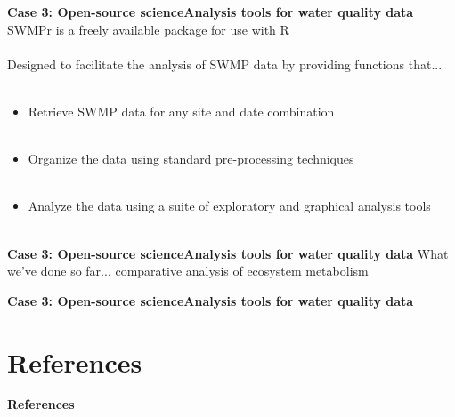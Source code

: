 \documentclass[serif]{beamer}\usepackage[]{graphicx}\usepackage[]{color}
\makeatletter
\newenvironment{kframe}{%
 \def\at@end@of@kframe{}%
 \ifinner\ifhmode%
  \def\at@end@of@kframe{\end{minipage}}%
  \begin{minipage}{\columnwidth}%
 \fi\fi%
 \def\FrameCommand##1{\hskip\@totalleftmargin \hskip-\fboxsep
 \colorbox{shadecolor}{##1}\hskip-\fboxsep
     \hskip-\linewidth \hskip-\@totalleftmargin \hskip\columnwidth}%
 \MakeFramed {\advance\hsize-\width
   \@totalleftmargin\z@ \linewidth\hsize
   \@setminipage}}%
 {\par\unskip\endMakeFramed%
 \at@end@of@kframe}
\newenvironment{knitrout}{}{} %
\makeatother
\begin{document}
\begin{frame}{\textbf{Case 3: Open-source science}}{\textbf{Analysis tools for water quality data}}
\alert{SWMPr} is a freely available package for use with R \\~\\
Designed to facilitate the analysis of SWMP data by providing functions that...\\~\\
\begin{itemize}
\item \alert{Retrieve} SWMP data for any site and date combination \\~\\ 
\item \alert{Organize} the data using standard pre-processing techniques \\~\\
\item \alert{Analyze} the data using a suite of exploratory and graphical analysis tools \\~\\
\end{itemize}
\end{frame}

\begin{frame}{\textbf{Case 3: Open-source science}}{\textbf{Analysis tools for water quality data}}
What we've done so far... comparative analysis of ecosystem metabolism 
\begin{knitrout}
\color{fgcolor}\begin{kframe}


{\ttfamily\noindent\bfseries\color{errorcolor}{\#\# Error: argument 1 is not a vector}}

{\ttfamily\noindent\bfseries\color{errorcolor}{\#\# Error: replacement has 0 rows, data has 452}}

{\ttfamily\noindent\bfseries\color{errorcolor}{\#\# Error: object 'sort.val' not found}}

{\ttfamily\noindent\bfseries\color{errorcolor}{\#\# Error: replacement has 0 rows, data has 452}}

{\ttfamily\noindent\bfseries\color{errorcolor}{\#\# Error: At least one layer must contain all variables used for facetting}}\end{kframe}
\end{knitrout}
\end{frame}

\begin{frame}{\textbf{Case 3: Open-source science}}{\textbf{Analysis tools for water quality data}}

\end{frame}

\section{References}
\begin{frame}[allowframebreaks]{\textbf{References}}
\tiny
{}


\end{frame}
\end{document}
